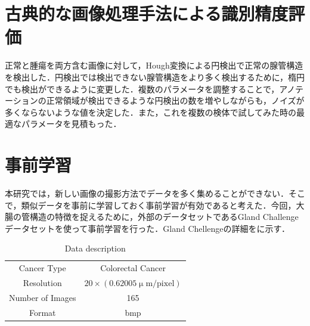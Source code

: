 \section{古典的な画像処理手法による識別精度評価}
正常と腫瘍を両方含む画像に対して，Hough変換による円検出で正常の腺管構造を検出した．円検出では検出できない腺管構造をより多く検出するために，楕円でも検出ができるように変更した．複数のパラメータを調整することで，アノテーションの正常領域が検出できるような円検出の数を増やしながらも，ノイズが多くならないような値を決定した．また，これを複数の検体で試してみた時の最適なパラメータを見積もった．

\section{事前学習}
本研究では，新しい画像の撮影方法でデータを多く集めることができない．そこで，類似データを事前に学習しておく事前学習が有効であると考えた．今回，大腸の管構造の特徴を捉えるために，外部のデータセットであるGland Challengeデータセットを使って事前学習を行った．Gland Chellengeの詳細をに示す．

\begin{table}[H]
	\centering
	\caption{Data description}
	\label{tab:GlandChallenge}
	\begin{tabular}{cc}\toprule
		Cancer Type & Colorectal Cancer \\ 
		Resolution & $20\times (0.62005 \upmu \mathrm{m / pixel})$ \\ 
		Number of Images & 165 \\ 
		Format & bmp \\ \bottomrule
	\end{tabular} 
\end{table}


